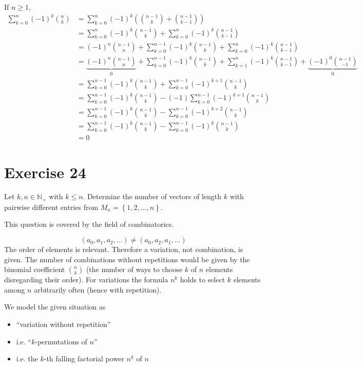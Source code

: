 \documentclass[a4paper]{article}
\theoremstyle{definition}
\newcommand\set[1]{\left\{#1\right\}}
\begin{document}
If $n \geq 1$,
\begin{align*}
  \sum_{k=0}^n (-1)^k \binom{n}{k}
    &= \sum_{k=0}^n (-1)^k \left(\binom{n-1}{k} + \binom{n-1}{k-1}\right) \\
    &= \sum_{k=0}^n (-1)^k \binom{n-1}{k} + \sum_{k=0}^n (-1)^k \binom{n-1}{k-1} \\
    &= (-1)^n \binom{n-1}{n} + \sum_{k=0}^{n-1} (-1)^k \binom{n-1}{k} + \sum_{k=0}^n (-1)^k \binom{n-1}{k-1} \\
    &= \underbrace{(-1)^n \binom{n-1}{n}}_0 + \sum_{k=0}^{n-1} (-1)^k \binom{n-1}{k} + \sum_{k=1}^{n} (-1)^k \binom{n-1}{k-1} + \underbrace{(-1)^0 \binom{n-1}{-1}}_0 \\
    &= \sum_{k=0}^{n-1} (-1)^k \binom{n-1}{k} + \sum_{k=0}^{n-1} (-1)^{k+1} \binom{n-1}{k} \\
    &= \sum_{k=0}^{n-1} (-1)^k \binom{n-1}{k} - (-1) \sum_{k=0}^{n-1} (-1)^{k+1} \binom{n-1}{k} \\
    &= \sum_{k=0}^{n-1} (-1)^k \binom{n-1}{k} - \sum_{k=0}^{n-1} (-1)^{k + 2} \binom{n-1}{k} \\
    &= \sum_{k=0}^{n-1} (-1)^k \binom{n-1}{k} - \sum_{k=0}^{n-1} (-1)^k \binom{n-1}{k} \\
    &= 0
\end{align*}

\clearpage
\section{Exercise 24}
\begin{ex}
  Let $k, n \in \mathbb N_+$ with $k \leq n$. Determine the number of vectors
  of length $k$ with pairwise different entries from $M_n = \set{1, 2, \ldots, n}$.
\end{ex}

This question is covered by the field of combinatorics.

\[ (a_0, a_1, a_2, \dots) \neq (a_0, a_2, a_1, \dots) \]
The order of elements is relevant. Therefore a variation, not combination, is given.
The number of combinations without repetitions would be given by the binomial
coefficient $n \choose k$ (the number of ways to choose $k$ of $n$ elements
disregarding their order). For variations the formula $n^k$ holds to select $k$
elements among $n$ arbitrarily often (hence with repetition).

We model the given situation as
\begin{itemize}
  \item \enquote{variation without repetition}
  \item i.e. \enquote{$k$-permutations of $n$}
  \item i.e. the $k$-th falling factorial power $n^{\underline{k}}$ of $n$
\end{itemize}
\end{document}
